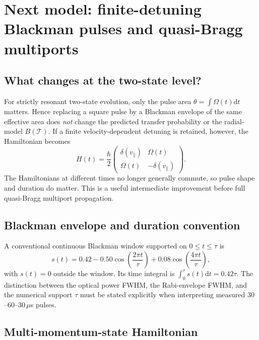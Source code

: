 \documentclass[11pt,a4paper]{article}
\numberwithin{equation}{section}
\newcommand{\Tat}{\mathcal{T}}
\newcommand{\dd}{\mathrm{d}}
\begin{document}
\section{Next model: finite-detuning Blackman pulses and quasi-Bragg multiports}

\subsection{What changes at the two-state level?}

For strictly resonant two-state evolution, only the pulse area
$\theta=\int\Omega(t)\dd t$ matters. Hence replacing a square pulse by a
Blackman envelope of the same effective area does \emph{not} change the
predicted transfer probability or the radial-model $B(\Tat)$.
If a finite velocity-dependent detuning is retained, however, the
Hamiltonian becomes
\begin{equation}
H(t)=\frac\hbar2\begin{pmatrix}
\delta(v_\parallel)&\Omega(t)\\
\Omega(t)&-\delta(v_\parallel)
\end{pmatrix}.
\end{equation}
The Hamiltonians at different times no longer generally commute, so pulse
shape and duration do matter. This is a useful intermediate improvement before
full quasi-Bragg multiport propagation.

\subsection{Blackman envelope and duration convention}

A conventional continuous Blackman window supported on $0\leq t\leq\tau$ is
\begin{equation}\label{eq:blackman}
 s(t)=0.42-0.50\cos\left(\frac{2\pi t}{\tau}\right)
 +0.08\cos\left(\frac{4\pi t}{\tau}\right),
\end{equation}
with $s(t)=0$ outside the window. Its time integral is
$\int_0^\tau s(t)\dd t=0.42\tau$. The distinction between the optical
power FWHM, the Rabi-envelope FWHM, and the numerical support $\tau$ must
be stated explicitly when interpreting measured $30$--$60$--$30\,\mu$s pulses.

\subsection{Multi-momentum-state Hamiltonian}
\end{document}
